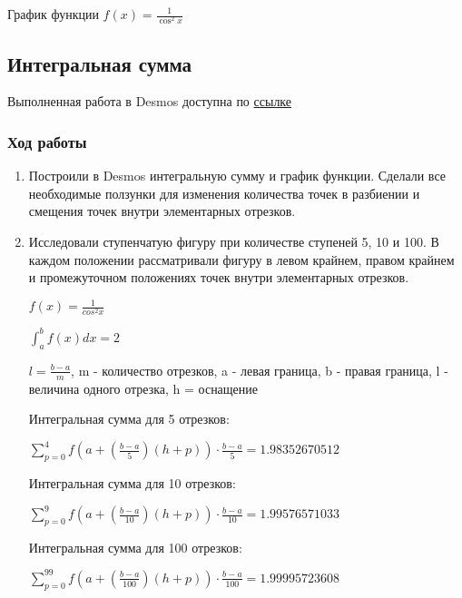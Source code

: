 \documentclass{article}
\begin{document}
\begin{center}
    
    \caption{График функции $f(x) = \frac{1}{\cos^2{x}}$}
    \label{fig:task1}
\end{center}

\subsection{Интегральная сумма}

Выполненная работа в Desmos доступна по 
\href{https://www.desmos.com/calculator/4mxkiocqhk?lang=ru}{ссылке}

\subsubsection*{Ход работы}

\begin{enumerate}
    \item Построили в Desmos интегральную сумму и график функции.
    Сделали все необходимые ползунки для изменения количества точек в разбиении
    и смещения точек внутри элементарных отрезков.
    \item Исследовали ступенчатую фигуру при количестве ступеней 5, 10 и 100. В каждом положении рассматривали фигуру в левом крайнем, правом крайнем и промежуточном положениях точек внутри элементарных отрезков.

    $f(x) = \frac{1}{cos^2{x}}$

    $\int_{a}^{b}f\left(x\right)dx = 2$

    $l = \frac{b-a}{m}$, m - количество отрезков, a - левая граница, b - правая граница, l - величина одного отрезка, h = оснащение

    Интегральная сумма для 5 отрезков:

    $\sum_{p=0}^{4}f\left(a+\left(\frac{b-a}{5}\right)\left(h+p\right)\right)\cdot\frac{b-a}{5} = 1.98352670512$

    Интегральная сумма для 10 отрезков:

    $\sum_{p=0}^{9}f\left(a+\left(\frac{b-a}{10}\right)\left(h+p\right)\right)\cdot\frac{b-a}{10} = 1.99576571033$

    Интегральная сумма для 100 отрезков:
    
    $\sum_{p=0}^{99}f\left(a+\left(\frac{b-a}{100}\right)\left(h+p\right)\right)\cdot\frac{b-a}{100} = 1.99995723608$
\end{enumerate}
\end{document}
